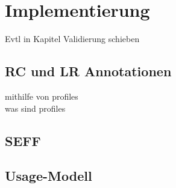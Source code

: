 
\chapter{Implementierung}
\label{ch:implementierung}
Evtl in Kapitel Validierung schieben
\section{RC und LR Annotationen}
mithilfe von profiles \\
was sind profiles

\section{SEFF}

\section{Usage-Modell}
